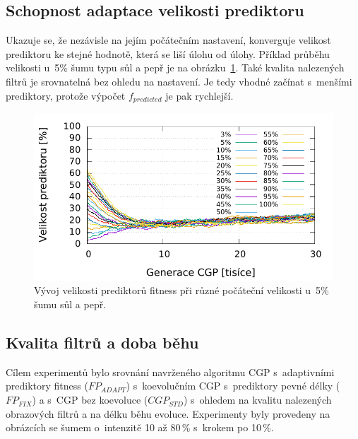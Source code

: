 \documentclass[czech]{ExcelAtFIT} %
\begin{document}
\subsection{Schopnost adaptace velikosti prediktoru}

Ukazuje se, že nezávisle na jejím počátečním nastavení, konverguje velikost prediktoru ke stejné hodnotě, která se liší úlohu od úlohy. Příklad průběhu velikosti u~5\% šumu typu sůl a pepř je na obrázku~\ref{fig:InitialSize}. Také kvalita nalezených filtrů je srovnatelná bez ohledu na nastavení. Je tedy vhodné začínat s~men\-šími pre\-dik\-tory, protože výpočet $f_\mathit{predicted}$ je pak rychlejší.


\begin{figure}[htb]
    \centering
    \includegraphics[width=0.9\linewidth]{images/initial-size-5-30kg.pdf}
    \caption{Vývoj velikosti prediktorů fitness při různé počáteční velikosti u~5\% šumu sůl a pepř.}
    \label{fig:InitialSize}
\end{figure}

\subsection{Kvalita filtrů a doba běhu}

Cílem experimentů bylo srovnání navrženého algoritmu CGP s~adaptivními prediktory fitness ($\mathit{FP_{ADAPT}}$) s~koevolučním CGP s~prediktory pevné délky ($\mathit{FP_{FIX}}$) a s~CGP bez koevoluce ($\mathit{CGP_{STD}}$) s~ohledem na kvalitu nalezených obrazových filtrů a na délku běhu evoluce. Experimenty byly provedeny na obrázcích se šumem o~intenzitě 10 až 80\,\% s~krokem po 10\,\%.
\end{document}
